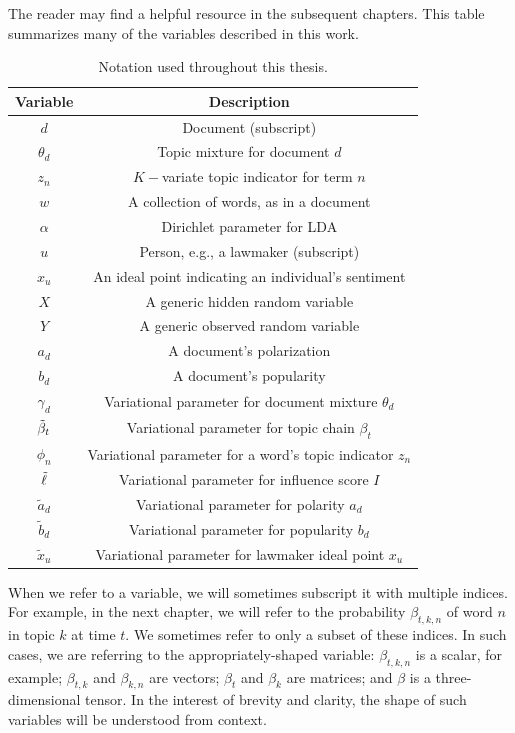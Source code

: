The reader may find  a helpful resource in the
subsequent chapters.  This table summarizes many of the variables
described in this work.
\begin{table}
  \caption{Notation used throughout this thesis.}
  \begin{center}
    \begin{tabular}{|c|c|}
      \hline
      \textbf{Variable} & \textbf{Description} \\
      \hline
      $d$ & Document (subscript) \\
      $\theta_d$ & Topic mixture for document $d$ \\
      $z_n$ & $K-$variate topic indicator for term $n$ \\
      $w$ & A collection of words, as in a document \\
      $\alpha$ & Dirichlet parameter for LDA \\
      $u$ & Person, e.g., a lawmaker (subscript) \\
      $x_u$ & An ideal point indicating an individual's sentiment \\
      $X$ & A generic hidden random variable \\
      $Y$ & A generic observed random variable \\
      $a_d$ & A document's polarization \\
      $b_d$ & A document's popularity \\
      \hline
      $\gamma_d$ & Variational parameter for document mixture $\theta_d$ \\
      $\tilde{\beta}_t$ & Variational parameter for topic chain $\beta_t$ \\
      $\phi_n$ & Variational parameter for a word's topic indicator $z_n$ \\
      $\tilde{\ell}$ & Variational parameter for influence score $I$ \\
      $\tilde a_d$ & Variational parameter for polarity $a_d$ \\
      $\tilde b_d$ & Variational parameter for popularity $b_d$ \\
      $\tilde x_u$ & Variational parameter for lawmaker ideal point $x_u$ \\
      \hline
    \end{tabular}
  \end{center}
\end{table}
When we refer to a variable, we will sometimes subscript it with
multiple indices.  For example, in the next chapter, we will refer to
the probability $\beta_{t,k,n}$ of word $n$ in topic $k$ at time
$t$. We sometimes refer to only a subset of these indices. In such
cases, we are referring to the appropriately-shaped variable:
$\beta_{t,k,n}$ is a scalar, for example; $\beta_{t,k}$ and $\beta_{k,n}$ are
vectors; $\beta_t$ and $\beta_k$ are matrices; and
$\beta$ is a three-dimensional tensor.  In the interest of brevity and
clarity, the shape of such variables will be understood from context.


